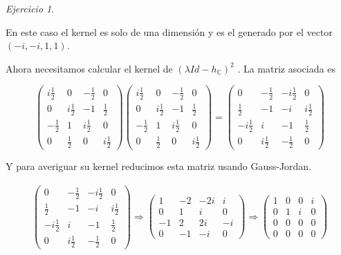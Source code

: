 \documentclass[11pt,a4paper]{article}
\theoremstyle{definition}
\theoremstyle{remark}
\newtheorem{exc}{Ejercicio}
\begin{document}
\begin{exc}
\begin{enumerate}
					En este caso el kernel es solo de una dimensión y es el generado por el vector $ (-i,-i,1,1) $.
					
					Ahora necesitamos calcular el kernel de $ (\lambda Id-h_\mathbb{C})^2 $ . La matriz asociada es
					
	\begin{equation}
		\begin{pmatrix}
	  	i\frac{1}{2} & 0 & -\frac{1}{2} & 0
	  	\\ 0 & i\frac{1}{2} & -1 & \frac{1}{2} 
	  	\\ -\frac{1}{2} & 1 & i\frac{1}{2} & 0
    	\\ 0 & \frac{1}{2} & 0 & i\frac{1}{2}
    	\end{pmatrix}
    	\begin{pmatrix}
    	i\frac{1}{2} & 0 & -\frac{1}{2} & 0
    	\\ 0 & i\frac{1}{2} & -1 & \frac{1}{2} 
    	\\ -\frac{1}{2} & 1 & i\frac{1}{2} & 0
    	\\ 0 & \frac{1}{2} & 0 & i\frac{1}{2}
    	\end{pmatrix} =
    	\begin{pmatrix}
    	0 & -\frac{1}{2} & -i\frac{1}{2} & 0
    	\\ \frac{1}{2} & -1 & -i & i\frac{1}{2} 
    	\\ -i\frac{1}{2} & i & -1 & \frac{1}{2}
    	\\ 0 & i\frac{1}{2} & -\frac{1}{2} & 0
    	\end{pmatrix} \nonumber
		\end{equation}
		
		Y para averiguar su kernel reducimos esta matriz usando Gauss-Jordan.
		
		\begin{multline}
		\begin{pmatrix}
    	0 & -\frac{1}{2} & -i\frac{1}{2} & 0
    	\\ \frac{1}{2} & -1 & -i & i\frac{1}{2} 
    	\\ -i\frac{1}{2} & i & -1 & \frac{1}{2}
    	\\ 0 & i\frac{1}{2} & -\frac{1}{2} & 0
    	\end{pmatrix} \Rightarrow
		\begin{pmatrix}
    	 1 & -2 & -2i & i 
    	\\0 & 1 & i & 0
    	\\ -1 & 2 & 2i & -i
    	\\ 0 & -1 & -i & 0
    	\end{pmatrix} \nonumber \Rightarrow
    	\begin{pmatrix}
   	 	1 & 0 & 0 & i 
    	\\0 & 1 & i & 0
    	\\ 0 & 0 & 0 & 0
    	\\ 0 & 0 & 0 & 0
 	    	\end{pmatrix}
		\end{multline}
		

\end{enumerate}
\end{exc}
\end{document}
